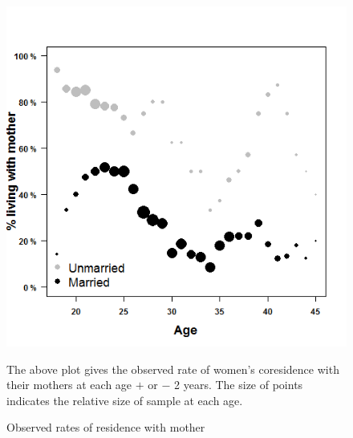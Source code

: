 \documentclass[10pt]{article}
\begin{document}
\begin{figure}[!tb]
    \centering
    \includegraphics[scale=.7]{images/obs_crmom}
\caption{Observed rates of residence with mother \label{fig:obs_crmom} }
\medskip
The above plot gives the observed rate of women's coresidence with their mothers at each age $+$ or $-$ 2 years.  The size of points indicates the relative size of sample at each age.
\end{figure}  
\end{document}
